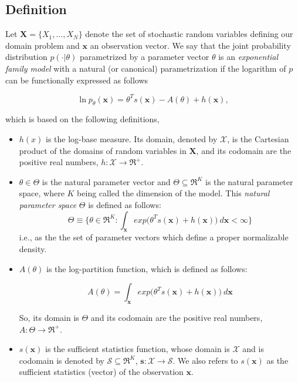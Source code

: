 \documentclass[11pt, oneside]{article}   	%
\newcommand{\bm}{\mathbf}
\numberwithin{figure}{section}
\numberwithin{equation}{section}
\numberwithin{table}{section}
\theoremstyle{definition}
\begin{document}
\subsection*{Definition}

Let $\bm X = \{X_1,\ldots,X_N\}$ denote the set of stochastic random variables defining our domain problem and $\bm x$ an observation vector.  We say that the joint probability distribution $p(\cdot|\theta)$ parametrized by a parameter vector $\theta$ is an \textit{exponential family model} with a natural (or canonical) parametrization if the logarithm of $p$ can be functionally expressed as follows

\begin{equation}
\label{Equation:EFCanonical}
\ln p_\theta(\bm x) = \theta^T s(\bm x) - A(\theta) + h(\bm x),
\end{equation}

\noindent which is based on the following definitions,


\begin{itemize}
\item $h(x)$ is the log-base measure. Its domain, denoted by $\mathcal{X}$, is the Cartesian product of the domains of random variables in $\bm X$, and its codomain are the positive real numbers, $ h: \mathcal{X} \rightarrow \Re^+$.

\item $\theta\in \Theta$ is the natural parameter vector and $\Theta\subseteq \Re^K$ is the natural parameter space, where $K$ being called  the dimension of the model. This \emph{natural parameter space} $\Theta$ is defined as follows:
\begin{equation}
\label{Equation:NPS}
\Theta \equiv \{ \theta \in\Re^K: \int_{\bm x} exp\big(\theta^T s(\bm x) + h(\bm x) \big)~d\bm x < \infty \}
\end{equation}
\noindent i.e., as the the set of parameter vectors which define a proper normalizable density. 

\item $A(\theta)$ is the log-partition function, which is defined as follows:

$$ A(\theta) = \int_{\bm x} exp\big(\theta^T s(\bm x) + h(\bm x)\big)~d\bm x$$

So, its domain is $\Theta$ and its codomain are the positive real numbers, $ A: \Theta \rightarrow \Re^+$.

\item $s(\bm x)$ is the sufficient statistics function, whose domain is $\mathcal{X}$ and is codomain is denoted by $\mathcal{S}\subseteq \Re^K$, $\bm s : \mathcal{X}\rightarrow \mathcal{S}$. We also refers to $s(\bm x)$ as the sufficient statistics (vector) of the observation $\bm x$. 
\end{itemize}
\end{document}
